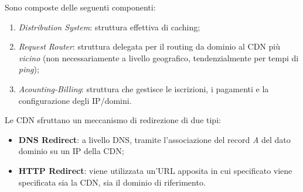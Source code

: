 Sono composte delle seguenti componenti:
\begin{enumerate}
    \item \textit{Distribution System}: struttura effettiva di caching;
    \item \textit{Request Router}: struttura delegata per il routing da dominio al CDN più \textit{vicino} (non necessariamente a livello geografico, tendenzialmente per tempi di \textit{ping});
    \item \textit{Acounting-Billing}: struttura che gestisce le iscrizioni, i pagamenti e la configurazione degli IP/domini.
\end{enumerate}
Le CDN sfruttano un meccanismo di redirezione di due tipi:
\begin{itemize}
    \item \textbf{DNS Redirect}: a livello DNS, tramite l'associazione del record \textit{A} del dato dominio su un IP della CDN;
    \item \textbf{HTTP Redirect}: viene utilizzata un'URL apposita in cui specificato viene specificata sia la CDN, sia il dominio di riferimento.
\end{itemize}